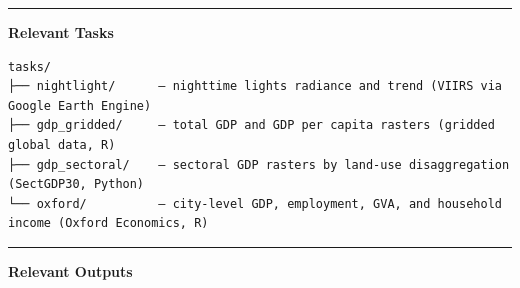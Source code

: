 \documentclass[
  letterpaper,
  DIV=11,
  numbers=noendperiod]{scrreprt}
\begin{document}
\begin{center}\rule{0.5\linewidth}{0.5pt}\end{center}

\textbf{Relevant Tasks}

\begin{verbatim}
tasks/
├── nightlight/      — nighttime lights radiance and trend (VIIRS via Google Earth Engine)
├── gdp_gridded/     — total GDP and GDP per capita rasters (gridded global data, R)
├── gdp_sectoral/    — sectoral GDP rasters by land-use disaggregation (SectGDP30, Python)
└── oxford/          — city-level GDP, employment, GVA, and household income (Oxford Economics, R)
\end{verbatim}

\begin{center}\rule{0.5\linewidth}{0.5pt}\end{center}

\textbf{Relevant Outputs}
\end{document}
